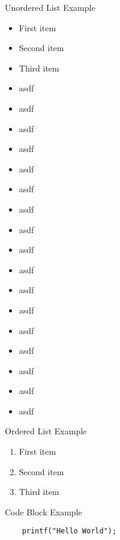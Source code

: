 \documentclass{beamer}
\begin{document}
\begin{frame}[allowframebreaks]{Unordered List Example}
    \begin{itemize}
        \item First item
        \item Second item
        \item Third item
        \item asdf
        \item asdf
        \item asdf
        \item asdf
        \item asdf
        \item asdf
        \item asdf
        \item asdf
        \item asdf
        \item asdf
        \item asdf
        \item asdf
        \item asdf
        \item asdf
        \item asdf
        \item asdf
        \item asdf
    \end{itemize}
\end{frame}

\begin{frame}{Ordered List Example}
    \begin{enumerate}
        \item First item
        \item Second item
        \item Third item
    \end{enumerate}
\end{frame}

\begin{frame}[fragile]{Code Block Example}
    \begin{verbatim}
    printf("Hello World");
    \end{verbatim}
\end{frame}
\end{document}
